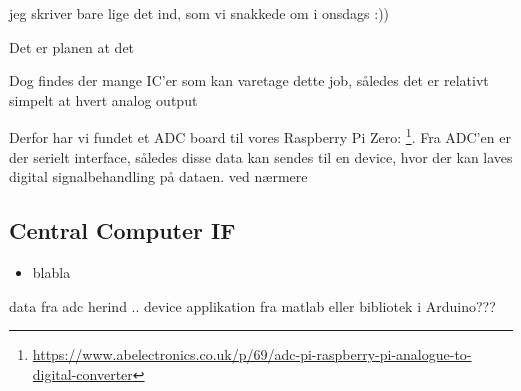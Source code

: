 jeg skriver bare lige det ind, som vi snakkede om i onsdags :))

Det er planen at det 

Dog findes der mange IC'er som kan varetage dette job, således det er relativt simpelt  at hvert analog output 

Derfor har vi fundet et ADC board til vores Raspberry Pi Zero: \footnote{\url{https://www.abelectronics.co.uk/p/69/adc-pi-raspberry-pi-analogue-to-digital-converter}}. Fra ADC'en er der serielt interface, således disse data kan sendes til en device, hvor der kan laves digital signalbehandling på dataen. 
ved nærmere 

\subsection{Central Computer IF}
\begin{itemize}
    \item blabla
\end{itemize}
data fra adc herind .. device applikation fra matlab eller bibliotek i Arduino???
